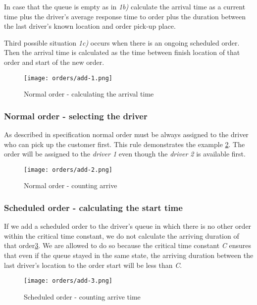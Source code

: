	In case that the queue is empty as in \textit{1b)} calculate the arrival time as a current time plus the driver's average response time to order plus the duration between the last driver's known location and order pick-up place.
	
	Third possible situation \textit{1c)} occurs when there is an ongoing scheduled order. Then the arrival time is calculated as the time between finish location of that order and start of the new order.
	
	
		\begin{figure}[h]\centering
			\texttt{[image: orders/add-1.png]}
			\caption{Normal order - calculating the arrival time} 
			\label{order-process-normal-order-counting-arrive}
		\end{figure} 
	
	\subsubsection{Normal order - selecting the driver}
	
		As described in specification normal order must be always assigned to the driver who can pick up the customer first. This rule demonstrates the example  \ref{order-process-normal-order-selecting-driver}. The order will be assigned to the \textit{driver 1} even though the \textit{driver 2} is available first.
		
			\begin{figure}[h]\centering
				\texttt{[image: orders/add-2.png]}
				\caption{Normal order - counting arrive} 
				\label{order-process-normal-order-selecting-driver}
			\end{figure} 
		
	\subsubsection{Scheduled order - calculating the start time}
		If we add a scheduled order to the driver's queue in which there is no other order within the critical time constant, we do not calculate the arriving duration of that order\ref{order-process-scheduled-order-counting-arrive-time}. We are allowed to do so because the critical time constant \textit{C} ensures that even if the queue stayed in the same state, the arriving duration between the last driver's location to the order start will be less than \textit{C}.
		
		\begin{figure}[h]\centering
			\texttt{[image: orders/add-3.png]}
			\caption{Scheduled order - counting arrive time} 
			\label{order-process-scheduled-order-counting-arrive-time}
		\end{figure} 
	
